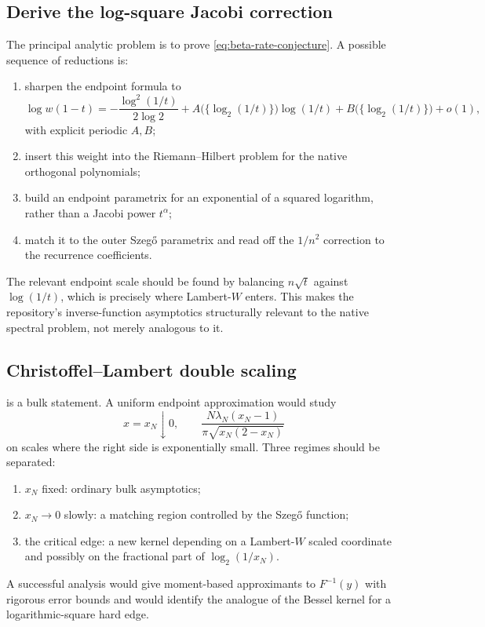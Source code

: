 \documentclass[11pt,oneside]{article}
\theoremstyle{definition}
\theoremstyle{remark}
\numberwithin{equation}{section}
\begin{document}
\subsection{Derive the log-square Jacobi correction}
The principal analytic problem is to prove
\cref{eq:beta-rate-conjecture}.  A possible sequence of reductions is:
\begin{enumerate}
\item sharpen the endpoint formula to
\begin{equation}
 \log w(1-t)=
 -\frac{\log^2(1/t)}{2\log2}
 +A\bigl(\{\log_2(1/t)\}\bigr)\log(1/t)
 +B\bigl(\{\log_2(1/t)\}\bigr)+o(1),
 \label{eq:desired-endpoint-normal-form}
\end{equation}
with explicit periodic $A,B$;
\item insert this weight into the Riemann--Hilbert problem for the native
      orthogonal polynomials;
\item build an endpoint parametrix for an exponential of a squared logarithm,
      rather than a Jacobi power $t^\alpha$;
\item match it to the outer Szeg\H{o} parametrix and read off the $1/n^2$
      correction to the recurrence coefficients.
\end{enumerate}
The relevant endpoint scale should be found by balancing
$n\sqrt t$ against $\log(1/t)$, which is precisely where Lambert-$W$ enters.
This makes the repository's inverse-function asymptotics structurally relevant
to the native spectral problem, not merely analogous to it.

\subsection{Christoffel--Lambert double scaling}
 is a bulk statement.  A
uniform endpoint approximation would study
\begin{equation}
 x=x_N\downarrow0,
 \qquad
 \frac{N\lambda_N(x_N-1)}{\pi\sqrt{x_N(2-x_N)}}
 \label{eq:christoffel-endpoint-scale}
\end{equation}
on scales where the right side is exponentially small.  Three regimes should
be separated:
\begin{enumerate}
\item $x_N$ fixed: ordinary bulk asymptotics;
\item $x_N\to0$ slowly: a matching region controlled by the Szeg\H{o}
      function;
\item the critical edge: a new kernel depending on a Lambert-$W$ scaled
      coordinate and possibly on the fractional part of $\log_2(1/x_N)$.
\end{enumerate}
A successful analysis would give moment-based approximants to $F^{-1}(y)$
with rigorous error bounds and would identify the analogue of the Bessel
kernel for a logarithmic-square hard edge.
\end{document}
